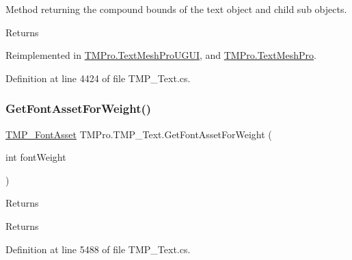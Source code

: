 Method returning the compound bounds of the text object and child sub objects. 

\begin{DoxyReturn}{Returns}

\end{DoxyReturn}


Reimplemented in \mbox{\hyperlink{class_t_m_pro_1_1_text_mesh_pro_u_g_u_i_aec6bee5f25f07eaeeefaa5f6cd6ad35c}{T\+M\+Pro.\+Text\+Mesh\+Pro\+U\+G\+UI}}, and \mbox{\hyperlink{class_t_m_pro_1_1_text_mesh_pro_ad718ed443f72e498e2fa64a1f794360d}{T\+M\+Pro.\+Text\+Mesh\+Pro}}.



Definition at line 4424 of file T\+M\+P\+\_\+\+Text.\+cs.

\mbox{\label{class_t_m_pro_1_1_t_m_p___text_a473e6fb93717c196a1d7d3c4670557a2}} 
\subsubsection{\texorpdfstring{GetFontAssetForWeight()}{GetFontAssetForWeight()}}
{\footnotesize\ttfamily \mbox{\hyperlink{class_t_m_pro_1_1_t_m_p___font_asset}{T\+M\+P\+\_\+\+Font\+Asset}} T\+M\+Pro.\+T\+M\+P\+\_\+\+Text.\+Get\+Font\+Asset\+For\+Weight (\begin{DoxyParamCaption}\item[{int}]{font\+Weight }\end{DoxyParamCaption})\hspace{0.3cm}{\ttfamily [protected]}}





\begin{DoxyReturn}{Returns}

\end{DoxyReturn}


\begin{DoxyReturn}{Returns}

\end{DoxyReturn}


Definition at line 5488 of file T\+M\+P\+\_\+\+Text.\+cs.

\mbox{\label{class_t_m_pro_1_1_t_m_p___text_a0a573365fce6e2d9e49b0f7d6679834b}} 
